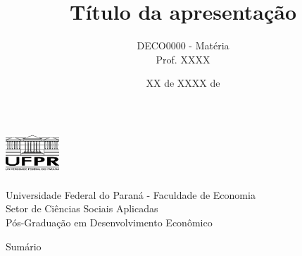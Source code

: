 \documentclass[aspectratio=169, 9pt]{beamer}
\title[short-title]{Título da apresentação}
\author[Felipe Duplat Luz]{DECO0000 - Matéria \\ Prof. XXXX}
\institute[UFPR] %
{
    \vspace{0.5mm} {\normalsize Felipe Duplat Luz} \vspace{5mm}
}
\date{XX de XXXX de \the\year{}}
\begin{document}
\begin{frame}[plain]
    \begin{center}
            \begin{minipage}[c]{0.2\linewidth}
                    \begin{center}
                    \includegraphics[width=2cm, height=1.7cm]{./Imagens/logo_UFPR.png} 
                    \end{center}
            \end{minipage}
            \begin{minipage}[c]{0.7\linewidth}
                    \begin{flushleft}
                    \begin{large}
                    Universidade Federal do Paraná - Faculdade de Economia \\ \vspace{1mm}Setor de Ciências Sociais Aplicadas \\
                    \vspace{1mm}Pós-Graduação em Desenvolvimento Econômico
                    \end{large} 
                    \end{flushleft}
            \end{minipage}
    \end{center}
\titlepage 
\end{frame}


\begingroup
{}
\begin{frame}{Sumário}
	\tableofcontents[hideallsubsections]
\end{frame}
\endgroup




\nocite{sotomayor21, dolevchenko09}



\end{document}
